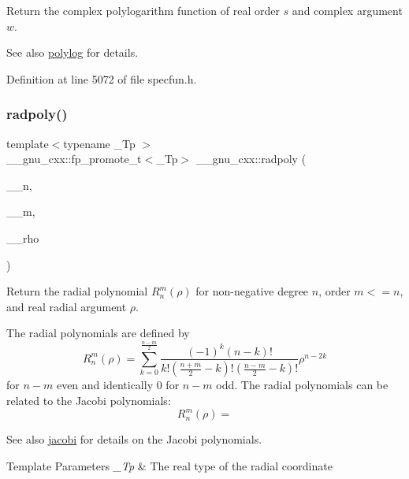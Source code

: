 Return the complex polylogarithm function of real order $ s $ and complex argument $ w $.

\begin{DoxySeeAlso}{See also}
\hyperlink{group__gnu__math__spec__func_gabcc5480ad739561c2debd6a8a352084f}{polylog} for details. 
\end{DoxySeeAlso}


Definition at line 5072 of file specfun.\+h.

\mbox{\label{group__gnu__math__spec__func_ga195db2592888b7a8df870d9eaeff8d05}} 
\subsubsection{\texorpdfstring{radpoly()}{radpoly()}}
{\footnotesize\ttfamily template$<$typename \+\_\+\+Tp $>$ \\
\+\_\+\+\_\+gnu\+\_\+cxx\+::fp\+\_\+promote\+\_\+t$<$\+\_\+\+Tp$>$ \+\_\+\+\_\+gnu\+\_\+cxx\+::radpoly (\begin{DoxyParamCaption}\item[{unsigned int}]{\+\_\+\+\_\+n,  }\item[{unsigned int}]{\+\_\+\+\_\+m,  }\item[{\+\_\+\+Tp}]{\+\_\+\+\_\+rho }\end{DoxyParamCaption})\hspace{0.3cm}{\ttfamily [inline]}}

Return the radial polynomial $ R_n^m(\rho) $ for non-\/negative degree $ n $, order $ m <= n $, and real radial argument $ \rho $.

The radial polynomials are defined by \[ R_n^m(\rho) = \sum_{k=0}^{\frac{n-m}{2}} \frac{(-1)^k(n-k)!}{k!(\frac{n+m}{2}-k)!(\frac{n-m}{2}-k)!} \rho^{n-2k} \] for $ n - m $ even and identically 0 for $ n - m $ odd. The radial polynomials can be related to the Jacobi polynomials\+: \[ R_n^m(\rho) = \] \begin{DoxySeeAlso}{See also}
\hyperlink{group__gnu__math__spec__func_gad54f6601748324d268532138eb38ca33}{jacobi} for details on the Jacobi polynomials.
\end{DoxySeeAlso}

\begin{DoxyTemplParams}{Template Parameters}
{\em \+\_\+\+Tp} & The real type of the radial coordinate \\
\hline
\end{DoxyTemplParams}

